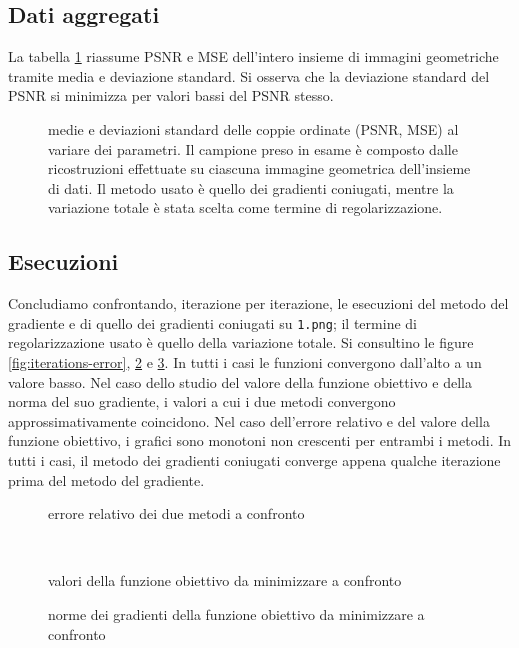 \documentclass[a4paper]{article}
\begin{document}
\subsection{Dati aggregati}
La tabella \ref{fig:aggregation} riassume PSNR e MSE dell'intero insieme di
immagini geometriche tramite media e deviazione standard.
Si osserva che la deviazione standard del PSNR si minimizza per valori bassi del
PSNR stesso.
\begin{figure}[H]
  \begin{center}
    \scalebox{0.65}{}
  \end{center}
  \caption{medie e deviazioni standard delle coppie ordinate (PSNR, MSE) al
  variare dei parametri. Il campione preso in esame è composto dalle
  ricostruzioni effettuate su ciascuna immagine geometrica dell'insieme di
  dati. Il metodo usato è quello dei gradienti coniugati, mentre la variazione
  totale è stata scelta come termine di regolarizzazione.}
  \label{fig:aggregation}
\end{figure}

\subsection{Esecuzioni}
Concludiamo confrontando, iterazione per iterazione, le esecuzioni del metodo
del gradiente e di quello dei gradienti coniugati su \verb!1.png!; il termine di
regolarizzazione usato è quello della variazione totale. Si consultino le figure
\ref{fig:iterations-error}, \ref{fig:iterations-objective} e
\ref{fig:iterations-gradient}. In tutti i casi le funzioni convergono dall'alto
a un valore basso. Nel caso dello studio del valore della funzione obiettivo e
della norma del suo gradiente, i valori a cui i due metodi convergono
approssimativamente coincidono. Nel caso dell'errore relativo e del valore della
funzione obiettivo, i grafici sono monotoni non crescenti per entrambi i metodi.
In tutti i casi, il metodo dei gradienti coniugati converge appena qualche
iterazione prima del metodo del gradiente.
\begin{figure}[H]
  \centering
  \begin{minipage}[t]{0.48\linewidth}
    \centering
    \scalebox{0.4}{}
    \label{fig:iterations-error}
    \caption{errore relativo dei due metodi a confronto}
  \end{minipage}
  \,\,
  \begin{minipage}[t]{0.48\linewidth}
    \centering
    \scalebox{0.4}{}
    \label{fig:iterations-objective}
    \caption{valori della funzione obiettivo da minimizzare a confronto}
  \end{minipage}
\end{figure}
\begin{figure}[H]
  \centering
  \begin{minipage}[t]{0.48\linewidth}
  \scalebox{0.4}{}
  \label{fig:iterations-gradient}
  \caption{norme dei gradienti della funzione obiettivo da minimizzare a
    confronto}
  \end{minipage}
\end{figure}
\end{document}
